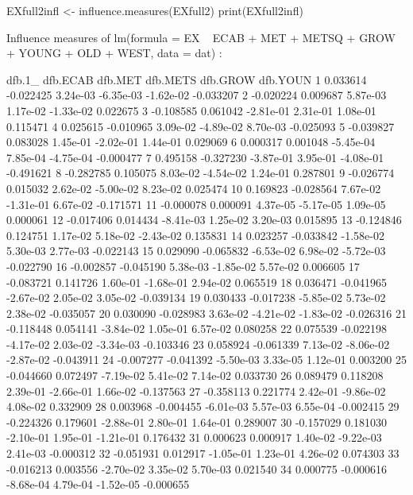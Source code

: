 \begin{Schunk}
\begin{Sinput}
 EXfull2infl <- influence.measures(EXfull2)
 print(EXfull2infl)
\end{Sinput}
\begin{Soutput}
Influence measures of
	 lm(formula = EX ~ ECAB + MET + METSQ + GROW + YOUNG + OLD + WEST,      data = dat) :

      dfb.1_  dfb.ECAB   dfb.MET  dfb.METS  dfb.GROW  dfb.YOUN
1   0.033614 -0.022425  3.24e-03 -6.35e-03 -1.62e-02 -0.033207
2  -0.020224  0.009687  5.87e-03  1.17e-02 -1.33e-02  0.022675
3  -0.108585  0.061042 -2.81e-01  2.31e-01  1.08e-01  0.115471
4   0.025615 -0.010965  3.09e-02 -4.89e-02  8.70e-03 -0.025093
5  -0.039827  0.083028  1.45e-01 -2.02e-01  1.44e-01  0.029069
6   0.000317  0.001048 -5.45e-04  7.85e-04 -4.75e-04 -0.000477
7   0.495158 -0.327230 -3.87e-01  3.95e-01 -4.08e-01 -0.491621
8  -0.282785  0.105075  8.03e-02 -4.54e-02  1.24e-01  0.287801
9  -0.026774  0.015032  2.62e-02 -5.00e-02  8.23e-02  0.025474
10  0.169823 -0.028564  7.67e-02 -1.31e-01  6.67e-02 -0.171571
11 -0.000078  0.000091  4.37e-05 -5.17e-05  1.09e-05  0.000061
12 -0.017406  0.014434 -8.41e-03  1.25e-02  3.20e-03  0.015895
13 -0.124846  0.124751  1.17e-02  5.18e-02 -2.43e-02  0.135831
14  0.023257 -0.033842 -1.58e-02  5.30e-03  2.77e-03 -0.022143
15  0.029090 -0.065832 -6.53e-02  6.98e-02 -5.72e-03 -0.022790
16 -0.002857 -0.045190  5.38e-03 -1.85e-02  5.57e-02  0.006605
17 -0.083721  0.141726  1.60e-01 -1.68e-01  2.94e-02  0.065519
18  0.036471 -0.041965 -2.67e-02  2.05e-02  3.05e-02 -0.039134
19  0.030433 -0.017238 -5.85e-02  5.73e-02  2.38e-02 -0.035057
20  0.030090 -0.028983  3.63e-02 -4.21e-02 -1.83e-02 -0.026316
21 -0.118448  0.054141 -3.84e-02  1.05e-01  6.57e-02  0.080258
22  0.075539 -0.022198 -4.17e-02  2.03e-02 -3.34e-03 -0.103346
23  0.058924 -0.061339  7.13e-02 -8.06e-02 -2.87e-02 -0.043911
24 -0.007277 -0.041392 -5.50e-03  3.33e-05  1.12e-01  0.003200
25 -0.044660  0.072497 -7.19e-02  5.41e-02  7.14e-02  0.033730
26  0.089479  0.118208  2.39e-01 -2.66e-01  1.66e-02 -0.137563
27 -0.358113  0.221774  2.42e-01 -9.86e-02  4.08e-02  0.332909
28  0.003968 -0.004455 -6.01e-03  5.57e-03  6.55e-04 -0.002415
29 -0.224326  0.179601 -2.88e-01  2.80e-01  1.64e-01  0.289007
30 -0.157029  0.181030 -2.10e-01  1.95e-01 -1.21e-01  0.176432
31  0.000623  0.000917  1.40e-02 -9.22e-03  2.41e-03 -0.000312
32 -0.051931  0.012917 -1.05e-01  1.23e-01  4.26e-02  0.074303
33 -0.016213  0.003556 -2.70e-02  3.35e-02  5.70e-03  0.021540
34  0.000775 -0.000616 -8.68e-04  4.79e-04 -1.52e-05 -0.000655

\end{Soutput}
\end{Schunk}
